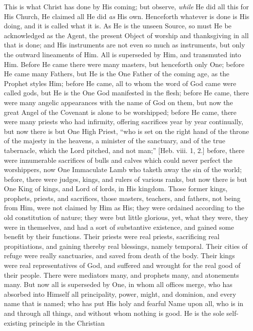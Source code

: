 This is what Christ has done by His coming; but observe, \emph{while}
He did all this for His Church, He claimed all He did \emph{as} His
own. Henceforth whatever is done is His doing, and it is called what
it is. As He is the unseen Source, so must He be acknowledged as the
Agent, the present Object of worship and thanksgiving in all that is
done; and His instruments are not even so much as instruments, but
only the outward lineaments of Him. All is superseded by Him, and
transmuted into Him. Before He came there were many masters, but
henceforth only One; before He came many Fathers, but He is the One
Father of the coming age, as the Prophet styles Him; before He
came, all to whom the word of God came were called gods, but He is the
One God manifested in the flesh; before He came, there were many
angelic appearances with the name of God on them, but now the great
Angel of the Covenant is alone to be worshipped; before He came, there
were many priests who had infirmity, offering sacrifices year by year
continually, but now there is but One High Priest, ``who is set on
the right hand of the throne of the majesty in the heavens, a minister
of the sanctuary, and of the true tabernacle, which the Lord pitched,
and not man;'' [Heb. viii. 1, 2.] before, there were innumerable
sacrifices of bulls and calves which could never perfect the
worshippers, now One Immaculate Lamb who taketh away the sin of the
world; before, there were judges, kings, and rulers of various ranks,
but now there is but One King of kings, and Lord of lords, in His
kingdom. Those former kings, prophets, priests, and sacrifices, those
masters, teachers, and fathers, not being from Him, were not claimed
by Him as His; they were ordained according to the old constitution of
nature; they were but little glorious, yet, what they were, they were
in themselves, and had a sort of substantive existence, and gained
some benefit by their functions. Their priests were real priests,
sacrificing real propitiations, and gaining thereby real blessings,
namely temporal. Their cities of refuge were really sanctuaries, and
saved from death of the body. Their kings were real representatives of
God, and suffered and wrought for the real good of their people. There were mediators many, and prophets many, and atonements many. But
now all is superseded by One, in whom all offices merge, who has
absorbed into Himself all principality, power, might, and dominion,
and every name that is named; who has put His holy and fearful Name
upon all, who is in and through all things, and without whom nothing
is good. He is the sole self-existing principle in the Christian
